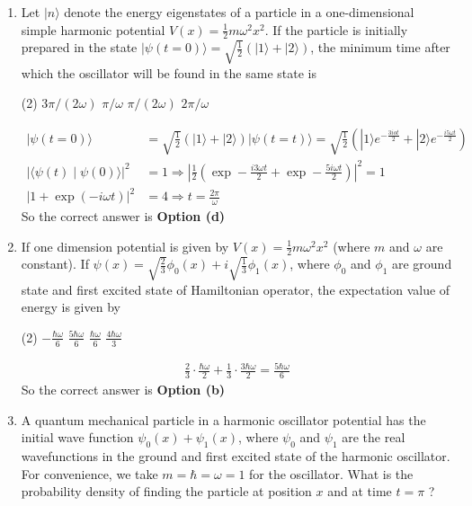 \begin{enumerate}
\begin{answer}
\end{answer}
\item Let $|n\rangle$ denote the energy eigenstates of a particle in a one-dimensional simple harmonic potential $V(x)=\frac{1}{2} m \omega^{2} x^{2}$. If the particle is initially prepared in the state $|\psi(t=0)\rangle=\sqrt{\frac{1}{2}}(|1\rangle+|2\rangle)$, the minimum time after which the oscillator will be found in the same state is
 \begin{tasks}(2)
	\task[\textbf{a.}]$3 \pi /(2 \omega)$
	\task[\textbf{b.}]$\pi / \omega$
	\task[\textbf{c.}]$\pi /(2 \omega)$
	\task[\textbf{d.}]$2 \pi / \omega$ 
\end{tasks}
\begin{answer}
	$$
	\begin{aligned}
	|\psi(t=0)\rangle&=\sqrt{\frac{1}{2}}(|1\rangle+|2\rangle)|\psi(t=t)\rangle=\sqrt{\frac{1}{2}}\left(|1\rangle e^{-\frac{3 i o t}{2}}+|2\rangle e^{-\frac{i 5 \omega t}{2}}\right)\\
	|\langle\psi(t) \mid \psi(0)\rangle|^{2}&=1 \Rightarrow\left|\frac{1}{2}\left(\exp -\frac{i 3 \omega t}{2}+\exp -\frac{5 i \omega t}{2}\right)\right|^{2}=1\\
	|1+\exp (-i \omega t)|^{2}&=4 \Rightarrow t=\frac{2 \pi}{\omega}
\end{aligned}
$$
So the correct answer is \textbf{Option (d)}
\end{answer}
\item If one dimension potential is given by $V(x)=\frac{1}{2} m \omega^{2} x^{2}$ (where $m$ and $\omega$ are constant).
If $\psi(x)=\sqrt{\frac{2}{3}} \phi_{0}(x)+i \sqrt{\frac{1}{3}} \phi_{1}(x)$, where $\phi_{0}$ and $\phi_{1}$ are ground state and first excited state of Hamiltonian operator, the expectation value of energy is given by
 \begin{tasks}(2)
	\task[\textbf{a.}]$-\frac{\hbar \omega}{6}$
	\task[\textbf{b.}]$\frac{5 \hbar \omega}{6}$
	\task[\textbf{c.}]$\frac{\hbar \omega}{6}$
	\task[\textbf{d.}] $\frac{4 \hbar \omega}{3}$
\end{tasks}
\begin{answer}
	$$
	\begin{aligned}
	\frac{2}{3} \cdot \frac{\hbar \omega}{2}+\frac{1}{3} \cdot \frac{3 \hbar \omega}{2}=\frac{5 \hbar \omega}{6}
\end{aligned}
$$
So the correct answer is \textbf{Option (b)}
\end{answer}
\item A quantum mechanical particle in a harmonic oscillator potential has the initial wave function $\psi_{0}(x)+\psi_{1}(x)$, where $\psi_{0}$ and $\psi_{1}$ are the real wavefunctions in the ground and first excited state of the harmonic oscillator. For convenience, we take $m=\hbar=\omega=1$ for the oscillator. What is the probability density of finding the particle at position $x$ and at time $t=\pi$ ?

\end{enumerate}
